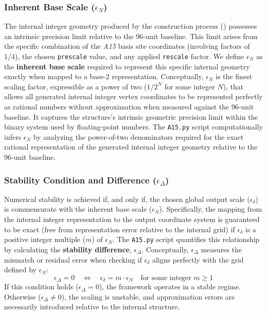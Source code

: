 \documentclass[10pt]{article}
\def\AAAB{\textit{A15}}
\begin{document}
\subsubsection{Inherent Base Scale ($\epsilon_N$)}\label{subsubsec-stability-epsilon-n}
The internal integer geometry produced by the construction process () possesses an intrinsic precision limit relative to the 96-unit baseline. This limit arises from the specific combination of the \AAAB{} basis site coordinates (involving factors of $1/4$), the chosen \texttt{prescale} value, and any applied \texttt{rescale} factor. We define $\epsilon_N$ as the \textbf{inherent base scale} required to represent this specific internal geometry exactly when mapped to a base-2 representation. Conceptually, $\epsilon_N$ is the finest scaling factor, expressible as a power of two ($1/2^N$ for some integer $N$), that allows all generated internal integer vertex coordinates to be represented perfectly as rational numbers without approximation when measured against the 96-unit baseline. It captures the structure's intrinsic geometric precision limit within the binary system used by floating-point numbers. The \texttt{A15.py} script computationally infers $\epsilon_N$ by analyzing the power-of-two denominators required for the exact rational representation of the generated internal integer geometry relative to the 96-unit baseline.

\subsubsection{Stability Condition and Difference ($\epsilon_\Delta$)}\label{subsubsec-stability-diff}
Numerical stability is achieved if, and only if, the chosen global output scale ($\epsilon_\delta$) is commensurate with the inherent base scale ($\epsilon_N$). Specifically, the mapping from the internal integer representation to the output coordinate system is guaranteed to be exact (free from representation error relative to the internal grid) if $\epsilon_\delta$ is a positive integer multiple ($m$) of $\epsilon_N$. The \texttt{A15.py} script quantifies this relationship by calculating the \textbf{stability difference}, $\epsilon_\Delta$. Conceptually, $\epsilon_\Delta$ measures the mismatch or residual error when checking if $\epsilon_\delta$ aligns perfectly with the grid defined by $\epsilon_N$:
\begin{equation}\label{eq-stability-condition}
\epsilon_\Delta = 0 \quad \iff \quad \epsilon_\delta = m \cdot \epsilon_N \quad \text{for some integer } m \ge 1
\end{equation}
If this condition holds ($\epsilon_\Delta = 0$), the framework operates in a stable regime. Otherwise ($\epsilon_\Delta \neq 0$), the scaling is unstable, and approximation errors are necessarily introduced relative to the internal structure.
\end{document}
